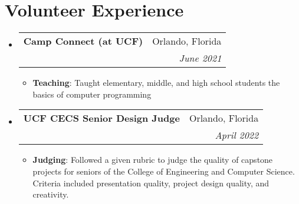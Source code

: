 \documentclass[a4paper,20pt]{article}
\makeatletter
\newcommand{\resumeItem}[2]{
  \item\small{
    \textbf{#1}{: #2 \vspace{-2pt}}
  }
}
\newcommand{\resumeSubheading}[4]{
  \vspace{-1pt}\item
    \begin{tabular*}{0.97\textwidth}{l@{\extracolsep{\fill}}r}
      \textbf{#1} & #2 \\
      \textit{#3} & \textit{#4} \\
    \end{tabular*}\vspace{-5pt}
}
\newcommand{\resumeSubHeadingListStart}{\begin{itemize}[leftmargin=*]}
\newcommand{\resumeSubHeadingListEnd}{\end{itemize}}
\newcommand{\resumeItemListStart}{\begin{itemize}}
\newcommand{\resumeItemListEnd}{\end{itemize}\vspace{-5pt}}
\makeatother
\begin{document}
\vspace{-5pt}
\section{Volunteer Experience}
\resumeSubHeadingListStart
\resumeSubheading
{Camp Connect (at UCF)}
{Orlando, Florida}
{}
{June 2021}
\resumeItemListStart
\resumeItem
{Teaching}
{Taught elementary, middle, and high school students the basics of computer programming}
\resumeItemListEnd


\vspace{2pt}
\resumeSubheading
{UCF CECS Senior Design Judge}
{Orlando, Florida}
{}
{April 2022}
\resumeItemListStart
\resumeItem
{Judging}
{Followed a given rubric to judge the quality of capstone projects for seniors of the College of Engineering and Computer Science.
Criteria included presentation quality, project design quality, and creativity.}
\resumeItemListEnd

\resumeSubHeadingListEnd
\end{document}
